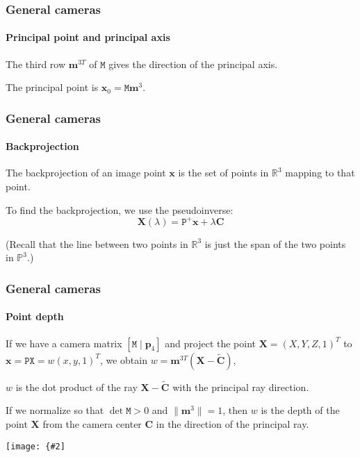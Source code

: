 \documentclass[aspectratio=169]{beamer}
\renewcommand{\vec}[1]{\boldsymbol{#1}}
\newcommand{\mat}[1]{\mathtt{#1}}
\def\Rset{\mathbb{R}}
\def\Pset{\mathbb{P}}
\newcommand{\myfig}[3]{\centerline{\texttt{[image: \{\#2]}}}
    \centerline{\scriptsize #3}}
\begin{document}
\begin{frame}
\frametitle{General cameras}
\framesubtitle{Principal point and principal axis}

The \alert{third row} $\vec{m}^{3T}$ of $\mat{M}$ gives the
\alert{direction of the principal axis}.

\medskip

The \alert{principal point} is $\vec{x}_0=\mat{M}\vec{m}^3$.

\end{frame}

\begin{frame}
\frametitle{General cameras}
\framesubtitle{Backprojection}

The \alert{backprojection} of an image point $\vec{x}$ is the set
of points in $\Rset^3$ mapping to that point.

\medskip

To find the backprojection, we use the pseudoinverse:
\begin{equation*}
\vec{X}(\lambda) = \mat{P}^+\vec{x} + \lambda\vec{C}
\end{equation*}

\medskip

(Recall that the line between two points in $\Rset^3$ is just the span
of the two points in $\Pset^3$.)

\end{frame}

\begin{frame}
\frametitle{General cameras}
\framesubtitle{Point depth}

If we have a camera matrix $[\mat{M} \mid \vec{p}_4]$ and project the
point $\vec{X}=(X,Y,Z,1)^T$ to $\vec{x}=\mat{P}\mat{X}=w(x,y,1)^T$,
we obtain $w=\vec{m}^{3T}(\vec{X}-\tilde{\vec{C}})$,

\medskip

$w$ is the dot product of the ray $\vec{X}-\tilde{\vec{C}}$ with
the principal ray direction.

\medskip

If we normalize so that $\det \mat{M} > 0$ and
$\|\vec{m}^3\|=1$, then $w$ is the \alert{depth} of the point
$\vec{X}$ from the camera center $\vec{C}$ in the direction of the
principal ray.

\medskip

\myfig{2in}{HZ-fig5-6}{Hartley and Zisserman, Fig.\ 6.6}

\end{frame}
\end{document}
